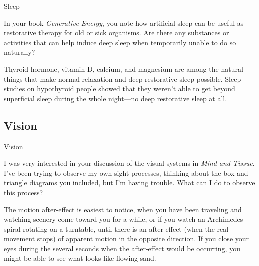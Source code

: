 \documentclass[11pt,oneside,openany,extrafontsizes]{memoir}
\begin{document}
\begin{qaexchange}{Sleep}

    \begin{question}
        In your book \textit{Generative Energy}, you note how artificial sleep can be useful as restorative therapy for old or sick organisms. Are there any substances or activities that can help induce deep sleep when temporarily unable to do so naturally? 
    \end{question}

    \begin{answer}
      Thyroid hormone, vitamin D, calcium, and magnesium are among the natural things that make normal relaxation and deep restorative sleep possible. Sleep studies on hypothyroid people showed that they weren't able to get beyond superficial sleep during the whole night—no deep restorative sleep at all.
    \end{answer}
\end{qaexchange}

\subsection{Vision}

\begin{qaexchange}{Vision}

    \begin{question}
        I was very interested in your discussion of the visual systems in \textit{Mind and Tissue}. I've been trying to observe my own sight processes, thinking about the box and triangle diagrams you included, but I'm having trouble. What can I do to observe this process?
    \end{question}

    \begin{answer}
      The motion after-effect is easiest to notice, when you have been traveling and watching scenery come toward you for a while, or if you watch an Archimedes spiral rotating on a turntable, until there is an after-effect (when the real movement stops) of apparent motion in the opposite direction. If you close your eyes during the several seconds when the after-effect would be occurring, you might be able to see what looks like flowing sand.
    \end{answer}
\end{qaexchange}
\end{document}
